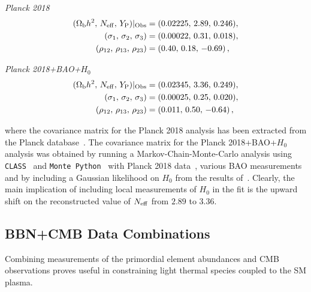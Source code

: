 \vspace{8pt}
\begin{minipage}{0.5\textwidth}
\centering \textit{Planck 2018}
\begin{align}\label{eq:CovarianceForm}
(\Omega_{\mathrm{b}} h^2,\,N_{\rm eff},\,Y_{\rm P})|_{\rm Obs} &= (0.02225,\, 2.89,\, 0.246),\nonumber  \\
(\sigma_{1},\,\sigma_{2},\,\sigma_{3}) &= (0.00022,\, 0.31,\, 0.018), \nonumber  \\
(\rho_{12},\,\rho_{13},\,\rho_{23}) &= ( 0.40,\, 0.18,\, -0.69) \,,
\end{align}
\end{minipage}
\begin{minipage}{0.49\textwidth}
\centering \textit{Planck 2018+BAO+$H_0$}
\begin{align}%
(\Omega_{\mathrm{b}} h^2,\,N_{\rm eff},\,Y_{\rm P})|_{\rm Obs} &= (0.02345,\, 3.36,\, 0.249), \nonumber  \\
(\sigma_{1},\,\sigma_{2},\,\sigma_{3}) &= (0.00025,\, 0.25,\, 0.020), \nonumber      \\
(\rho_{12},\,\rho_{13},\,\rho_{23}) &= (0.011,\, 0.50,\, -0.64) \,,
\end{align}
\end{minipage}
\vspace{0.2cm}

\noindent where the covariance matrix for the Planck 2018 analysis has been extracted from the Planck database~\cite{Aghanim:2018eyx,Aghanim:2019ame}. The covariance matrix for the Planck 2018+BAO+$H_0$ analysis was obtained by running a Markov-Chain-Monte-Carlo analysis using \texttt{CLASS}~\cite{Blas:2011rf,Lesgourgues:2011re} and \texttt{Monte Python}~\cite{Brinckmann:2018cvx,Audren:2012wb} with Planck 2018 data~\cite{Aghanim:2018eyx,Aghanim:2019ame}, various BAO measurements~\cite{Beutler:2011hx,Ross:2014qpa,Alam:2016hwk} and by including a Gaussian likelihood on $H_0$ from the results of~\cite{Riess:2019cxk}. Clearly, the main implication of including local measurements of $H_0$ in the fit is the upward shift on the reconstructed value of $N_{\rm eff}$ from $2.89$ to $3.36$. 
 

\subsection{BBN+CMB Data Combinations}\label{sec:Statistics}
Combining measurements of the primordial element abundances and CMB observations proves useful in constraining light thermal species coupled to the SM plasma.

